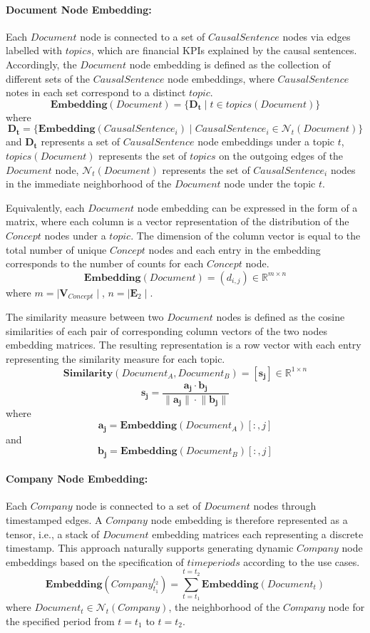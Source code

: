 \paragraph{Document Node Embedding:} Each $Document$ node is connected to a set of $CausalSentence$ nodes via edges labelled with $topics$, which are financial KPIs explained by the causal sentences. Accordingly, the $Document$ node embedding is defined as the collection of different sets of the $CausalSentence$ node embeddings, where $CausalSentence$ notes in each set correspond to a distinct $topic$. 
\[ \mathbf{Embedding}(Document) =  \{ \mathbf{D_t} \mid t \in topics(Document) \} \]
where
\[ \mathbf{D_t} = \{ \mathbf{Embedding}(CausalSentence_i) \mid CausalSentence_i \in \mathcal{N}_t(Document) \} \]
and $\mathbf{D_t}$ represents a set of $CausalSentence$ node embeddings under a topic $t$, $topics(Document)$ represents the set of $topics$ on the outgoing edges of the $Document$ node, $\mathcal{N}_t(Document)$ represents the set of $CausalSentence_i$ nodes in the immediate neighborhood of the $Document$ node under the topic $t$.

Equivalently, each $Document$ node embedding can be expressed in the form of a matrix, where each column is a vector representation of the distribution of the $Concept$ nodes under a $topic$. The dimension of the column vector is equal to the total number of unique $Concept$ nodes and each entry in the embedding corresponds to the number of counts for each $Concept$ node.
\[ \mathbf{Embedding}(Document) =  (d_{i,j}) \in \mathbb{R}^{m \times n} \] 
where $m=\mid \mathbf{V}_{Concept} \mid$,  $n=\mid \mathbf{E}_2 \mid$.

The similarity measure between two $Document$ nodes is defined as the cosine similarities of each pair of corresponding column vectors of the two nodes embedding matrices. The resulting representation is a row vector with each entry representing the similarity measure for each topic.
\[ \mathbf{Similarity}(Document_A, Document_B) = [ \mathbf{s_j} ] \in \mathbb{R}^{1 \times n}\]
\[  \mathbf{s_j} = \frac{\mathbf{a_j \cdot b_j} } {\mathbf{\lVert a_j \rVert \cdot \lVert b_j \rVert}} \]  
where 
\[ \mathbf{a_j} = \textbf{Embedding}(Document_A)[: , j] \]
and 
\[ \mathbf{b_j} = \textbf{Embedding}(Document_B)[: , j] \]


\paragraph{Company Node Embedding:} Each $Company$ node is connected to a set of $Document$ nodes through timestamped edges. A $Company$ node embedding is therefore represented as a tensor, i.e., a stack of $Document$ embedding matrices each representing a discrete timestamp. This approach naturally supports generating dynamic $Company$ node embeddings based on the specification of $time periods$ according to the use cases. 
\[ \mathbf{Embedding}(Company_{t_1}^{t_2}) = \sum_{t=t_1} ^{t=t_2} {\mathbf{Embedding}(Document_t)}\]  
where $Document_t \in \mathcal{N}_t(Company)$, the neighborhood of the $Company$ node for the specified period from $t=t_1$ to $t=t_2$. 

